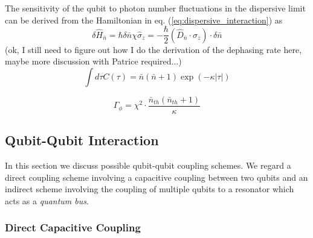 \smallskip

The sensitivity of the qubit to photon number fluctuations in the dispersive limit can be derived from the Hamiltonian in eq. (\ref{eq:dispersive_interaction}) as
%
\begin{equation}
\delta \hat{H}_{\bar{n}}=\hbar\delta\bar{n}\chi\hat{\sigma}_z = -\frac{\hbar}{2}\left(\hat{D}_{\bar{n}}\cdot\sigma_z\right)\cdot \delta \bar{n}
\end{equation}
%
(ok, I still need to figure out how I do the derivation of the dephasing rate here, maybe more discussion with Patrice required...)
%
\begin{equation}
\int d\tau C(\tau) = \bar{n}(\bar{n}+1)\exp{\left(-\kappa |\tau|\right)}
\end{equation}
%

%
\begin{equation}
\Gamma_\phi = \chi^2\cdot \frac{\bar{n}_{th}\left(\bar{n}_{th}+1\right)}{\kappa}
\end{equation}
%

\subsection{Qubit-Qubit Interaction}

In this section we discuss possible qubit-qubit coupling schemes. We regard a direct coupling scheme involving a capacitive coupling between two qubits and an indirect scheme involving the coupling of multiple qubits to a resonator which acts as a {\it quantum bus}.

\subsubsection{Direct Capacitive Coupling}

